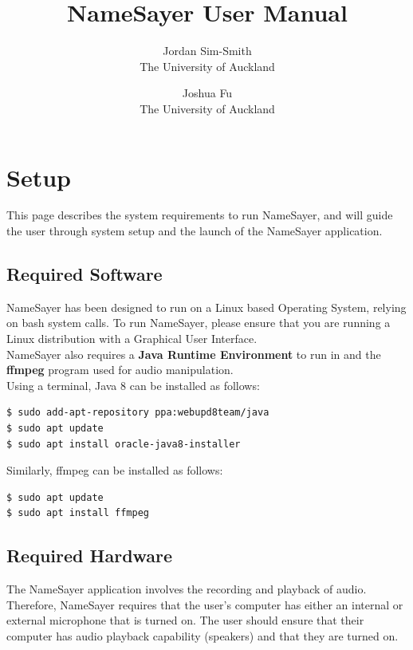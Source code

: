 \documentclass{article}
\begin{document}
\title{NameSayer User Manual}
\author{Jordan Sim-Smith \\
		The University of Auckland \\
		\and
		Joshua Fu \\
		The University of Auckland \\
		}

\maketitle

\clearpage

\tableofcontents

\clearpage

\section{Setup}

This page describes the system requirements to run NameSayer, and will guide the
user through system setup and the launch of the NameSayer application.

\subsection{Required Software}

NameSayer has been designed to run on a Linux based Operating System, relying on
bash system calls. To run NameSayer, please ensure that you are running a Linux
distribution with a Graphical User Interface. \\

NameSayer also requires a \textbf{Java Runtime Environment} to run in and the
\textbf{ffmpeg} program used for audio manipulation. \\

Using a terminal, Java 8 can be installed as follows:
\begin{verbatim}
$ sudo add-apt-repository ppa:webupd8team/java
$ sudo apt update
$ sudo apt install oracle-java8-installer
\end{verbatim}

Similarly, ffmpeg can be installed as follows:
\begin{verbatim}
$ sudo apt update
$ sudo apt install ffmpeg
\end{verbatim}

\subsection{Required Hardware}
The NameSayer application involves the recording and playback of audio.
Therefore, NameSayer requires that the user's computer has either an internal or
external microphone that is turned on. The user should ensure that their
computer has audio playback capability (speakers) and that they are turned on.
\end{document}
